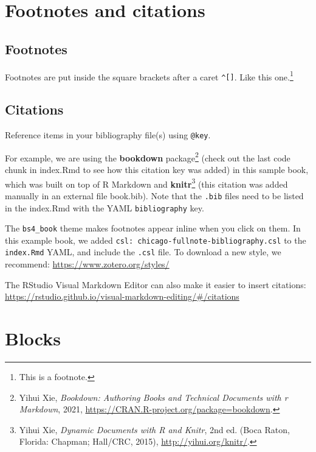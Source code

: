 \documentclass[
]{book}
\theoremstyle{definition}
\theoremstyle{definition}
\theoremstyle{definition}
\theoremstyle{definition}
\theoremstyle{remark}
\begin{document}
\hypertarget{footnotes-and-citations}{%
\chapter{Footnotes and citations}\label{footnotes-and-citations}}

\hypertarget{footnotes}{%
\section{Footnotes}\label{footnotes}}

Footnotes are put inside the square brackets after a caret \texttt{\^{}{[}{]}}. Like this one.\footnote{This is a footnote.}

\hypertarget{citations}{%
\section{Citations}\label{citations}}

Reference items in your bibliography file(s) using \texttt{@key}.

For example, we are using the \textbf{bookdown} package\footnote{Yihui Xie, \emph{Bookdown: Authoring Books and Technical Documents with r Markdown}, 2021, \url{https://CRAN.R-project.org/package=bookdown}.} (check out the last code chunk in index.Rmd to see how this citation key was added) in this sample book, which was built on top of R Markdown and \textbf{knitr}\footnote{Yihui Xie, \emph{Dynamic Documents with {R} and Knitr}, 2nd ed. (Boca Raton, Florida: Chapman; Hall/CRC, 2015), \url{http://yihui.org/knitr/}.} (this citation was added manually in an external file book.bib).
Note that the \texttt{.bib} files need to be listed in the index.Rmd with the YAML \texttt{bibliography} key.

The \texttt{bs4\_book} theme makes footnotes appear inline when you click on them. In this example book, we added \texttt{csl:\ chicago-fullnote-bibliography.csl} to the \texttt{index.Rmd} YAML, and include the \texttt{.csl} file. To download a new style, we recommend: \url{https://www.zotero.org/styles/}

The RStudio Visual Markdown Editor can also make it easier to insert citations: \url{https://rstudio.github.io/visual-markdown-editing/\#/citations}

\hypertarget{blocks}{%
\chapter{Blocks}\label{blocks}}
\end{document}
